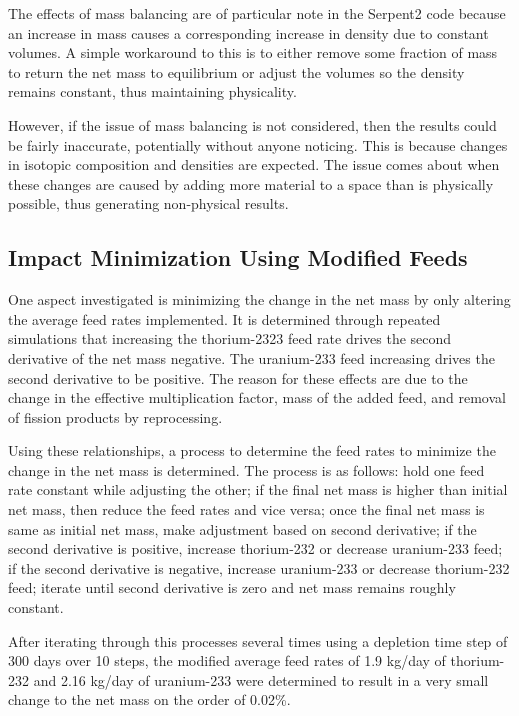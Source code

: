 The effects of mass balancing are of particular note in the Serpent2 code because an increase in mass causes a corresponding increase in density due to constant volumes. A simple workaround to this is to either remove some fraction of mass to return the net mass to equilibrium or adjust the volumes so the density remains constant, thus maintaining physicality.

However, if the issue of mass balancing is not considered, then the results could be fairly inaccurate, potentially without anyone noticing. This is because changes in isotopic composition and densities are expected. The issue comes about when these changes are caused by adding more material to a space than is physically possible, thus generating non-physical results.

\subsection{Impact Minimization Using Modified Feeds}

One aspect investigated is minimizing the change in the net mass by only altering the average feed rates implemented. It is determined through repeated simulations that increasing the thorium-2323 feed rate drives the second derivative of the net mass negative. The uranium-233 feed increasing drives the second derivative to be positive. The reason for these effects are due to the change in the effective multiplication factor, mass of the added feed, and removal of fission products by reprocessing.

Using these relationships, a process to determine the feed rates to minimize the change in the net mass is determined. The process is as follows:  hold one feed rate constant while adjusting the other;
if the final net mass is higher than initial net mass, then reduce the feed rates and vice versa;
once the final net mass is same as initial net mass, make adjustment based on second derivative;
if the second derivative is positive, increase thorium-232 or decrease uranium-233 feed;
if the second derivative is negative, increase uranium-233 or decrease thorium-232 feed;
iterate until second derivative is zero and net mass remains roughly constant.

After iterating through this processes several times using a depletion time step of 300 days over 10 steps, the modified average feed rates of 1.9 kg/day of thorium-232 and 2.16 kg/day of uranium-233 were determined to result in a very small change to the net mass on the order of 0.02\%.

